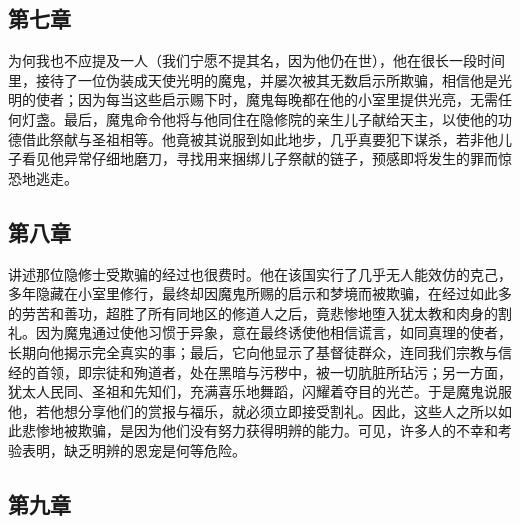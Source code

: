 
\subsection{第七章}

\par

为何我也不应提及一人（我们宁愿不提其名，因为他仍在世），他在很长一段时间里，接待了一位伪装成天使光明的魔鬼，并屡次被其无数启示所欺骗，相信他是光明的使者；因为每当这些启示赐下时，魔鬼每晚都在他的小室里提供光亮，无需任何灯盏。最后，魔鬼命令他将与他同住在隐修院的亲生儿子献给天主，以使他的功德借此祭献与圣祖相等。他竟被其说服到如此地步，几乎真要犯下谋杀，若非他儿子看见他异常仔细地磨刀，寻找用来捆绑儿子祭献的链子，预感即将发生的罪而惊恐地逃走。\par


\subsection{第八章}

\par

讲述那位隐修士受欺骗的经过也很费时。他在该国实行了几乎无人能效仿的克己，多年隐藏在小室里修行，最终却因魔鬼所赐的启示和梦境而被欺骗，在经过如此多的劳苦和善功，超胜了所有同地区的修道人之后，竟悲惨地堕入犹太教和肉身的割礼。因为魔鬼通过使他习惯于异象，意在最终诱使他相信谎言，如同真理的使者，长期向他揭示完全真实的事；最后，它向他显示了基督徒群众，连同我们宗教与信经的首领，即宗徒和殉道者，处在黑暗与污秽中，被一切肮脏所玷污；另一方面，犹太人民同、圣祖和先知们，充满喜乐地舞蹈，闪耀着夺目的光芒。于是魔鬼说服他，若他想分享他们的赏报与福乐，就必须立即接受割礼。因此，这些人之所以如此悲惨地被欺骗，是因为他们没有努力获得明辨的能力。可见，许多人的不幸和考验表明，缺乏明辨的恩宠是何等危险。\par


\subsection{第九章}

